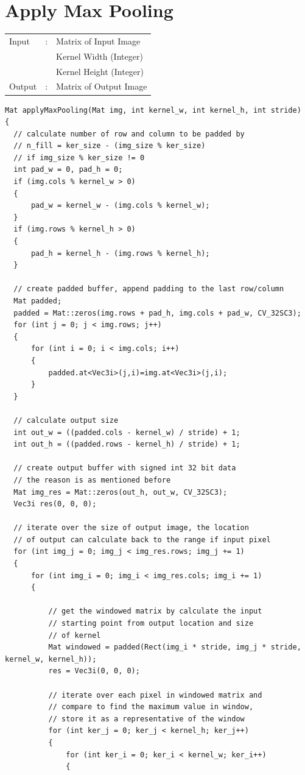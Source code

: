 \documentclass[12pt,a4paper]{report}
\begin{document}
\section{Apply Max Pooling}
\begin{tabular}{lll}
  Input  & : & Matrix of Input Image   \\
         &   & Kernel Width (Integer)  \\
         &   & Kernel Height (Integer) \\
  Output & : & Matrix of Output Image  \\
\end{tabular}
\begin{lstlisting}
Mat applyMaxPooling(Mat img, int kernel_w, int kernel_h, int stride)
{
  // calculate number of row and column to be padded by
  // n_fill = ker_size - (img_size % ker_size)
  // if img_size % ker_size != 0
  int pad_w = 0, pad_h = 0;
  if (img.cols % kernel_w > 0)
  {
      pad_w = kernel_w - (img.cols % kernel_w);
  }
  if (img.rows % kernel_h > 0)
  {
      pad_h = kernel_h - (img.rows % kernel_h);
  }

  // create padded buffer, append padding to the last row/column
  Mat padded;
  padded = Mat::zeros(img.rows + pad_h, img.cols + pad_w, CV_32SC3);
  for (int j = 0; j < img.rows; j++)
  {
      for (int i = 0; i < img.cols; i++)
      {
          padded.at<Vec3i>(j,i)=img.at<Vec3i>(j,i);
      }
  }

  // calculate output size
  int out_w = ((padded.cols - kernel_w) / stride) + 1;
  int out_h = ((padded.rows - kernel_h) / stride) + 1;

  // create output buffer with signed int 32 bit data
  // the reason is as mentioned before
  Mat img_res = Mat::zeros(out_h, out_w, CV_32SC3);
  Vec3i res(0, 0, 0);

  // iterate over the size of output image, the location
  // of output can calculate back to the range if input pixel
  for (int img_j = 0; img_j < img_res.rows; img_j += 1)
  {
      for (int img_i = 0; img_i < img_res.cols; img_i += 1)
      {

          // get the windowed matrix by calculate the input
          // starting point from output location and size 
          // of kernel
          Mat windowed = padded(Rect(img_i * stride, img_j * stride, kernel_w, kernel_h));
          res = Vec3i(0, 0, 0);

          // iterate over each pixel in windowed matrix and 
          // compare to find the maximum value in window,
          // store it as a representative of the window
          for (int ker_j = 0; ker_j < kernel_h; ker_j++)
          {
              for (int ker_i = 0; ker_i < kernel_w; ker_i++)
              {


\end{lstlisting}
\end{document}
